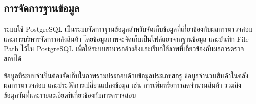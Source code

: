 \subsection{การจัดการฐานข้อมูล}

ระบบใช้ PostgreSQL เป็นระบบจัดการฐานข้อมูลสำหรับจัดเก็บข้อมูลที่เกี่ยวข้องกับผลการตรวจสอบและการบริหารจัดการคลังสินค้า โดยข้อมูลภาพจะจัดเก็บเป็นไฟล์แยกจากฐานข้อมูล และบันทึก File Path ไว้ใน PostgreSQL เพื่อให้ระบบสามารถอ้างอิงและเรียกใช้ภาพที่เกี่ยวข้องกับผลการตรวจสอบได้

ข้อมูลที่ระบบจำเป็นต้องจัดเก็บในภาพรวมประกอบด้วยข้อมูลประเภทสกรู ข้อมูลจำนวนสินค้าในคลัง ผลการตรวจสอบ และประวัติการเปลี่ยนแปลงข้อมูล เช่น การเพิ่มหรือการลดจำนวนสินค้า รวมถึงข้อมูลวันที่และรายละเอียดที่เกี่ยวข้องกับการตรวจสอบ